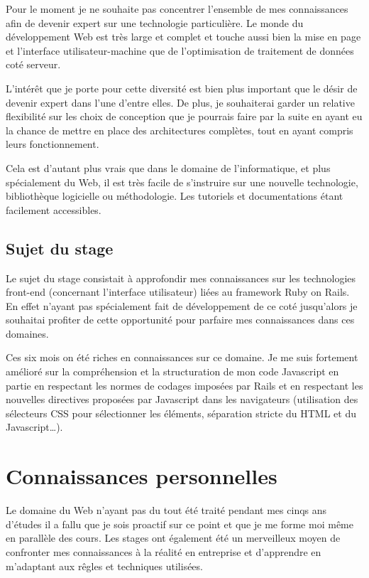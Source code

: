\documentclass[12pt,a4paper]{book}
\begin{document}
Pour le moment je ne souhaite pas concentrer l'ensemble de mes connaissances afin de devenir expert sur une technologie particulière. Le monde du développement Web est très large et complet et touche aussi bien la mise en page et l'interface utilisateur-machine que de l'optimisation de traitement de données coté serveur.

L'intérêt que je porte pour cette diversité est bien plus important que le désir de devenir expert dans l'une d'entre elles. De plus, je souhaiterai garder un relative flexibilité sur les choix de conception que je pourrais faire par la suite en ayant eu la chance de mettre en place des architectures complètes, tout en ayant compris leurs fonctionnement.

Cela est d'autant plus vrais que dans le domaine de l'informatique, et plus spécialement du Web, il est très facile de s'instruire sur une nouvelle technologie, bibliothèque logicielle ou méthodologie. Les tutoriels et documentations étant facilement accessibles.

\subsection{Sujet du stage}

Le sujet du stage consistait à approfondir mes connaissances sur les technologies front-end (concernant l'interface utilisateur) liées au framework Ruby on Rails. En effet n'ayant pas spécialement fait de développement de ce coté jusqu'alors je souhaitai profiter de cette opportunité pour parfaire mes connaissances dans ces domaines.

Ces six mois on été riches en connaissances sur ce domaine. Je me suis fortement amélioré sur la compréhension et la structuration de mon code Javascript en partie en respectant les normes de codages imposées par Rails et en respectant les nouvelles directives proposées par Javascript dans les navigateurs (utilisation des sélecteurs CSS pour sélectionner les éléments, séparation stricte du HTML et du Javascript…).

\section{Connaissances personnelles}

Le domaine du Web n'ayant pas du tout été traité pendant mes cinqs ans d'études il a fallu que je sois proactif sur ce point et que je me forme moi même en parallèle des cours. Les stages ont également été un merveilleux moyen de confronter mes connaissances à la réalité en entreprise et d'apprendre en m'adaptant aux rêgles et techniques utilisées.
\end{document}
